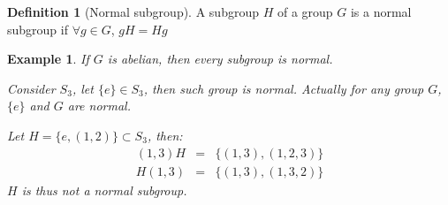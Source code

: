 \documentclass{article}
\theoremstyle{MyNonumberplain}
\theoremstyle{break}
\theoremstyle{break}
\newtheorem{example}{Example}[section]
\theoremstyle{break}
\theoremstyle{definition}
\theoremstyle{break}
\newtheorem{definition}{Definition}[section]
\begin{document}
\begin{defbox}
    \begin{definition}[Normal subgroup]
        A subgroup $H$ of a group $G$ is a normal subgroup if $\forall g \in G$, $g H = H g$
    \end{definition}
\end{defbox}

\begin{expbox}
    \begin{example}
        If $G$ is abelian, then every subgroup is normal.\bigskip

        Consider $S_3$, let $\{ e \} \in S_3$, then such group is normal. Actually
        for any group $G$, $\{ e \}$ and $G$ are normal.\bigskip

        Let $H = \{ e, (1, 2) \} \subset S_3$, then:
        \begin{eqnarray*}
        (1, 3) H & = & \{ (1, 3), (1, 2, 3) \}\\
        H (1, 3) & = & \{ (1, 3), (1, 3, 2) \}
        \end{eqnarray*}
        $H$ is thus not a normal subgroup.
    \end{example}
\end{expbox}
\end{document}
